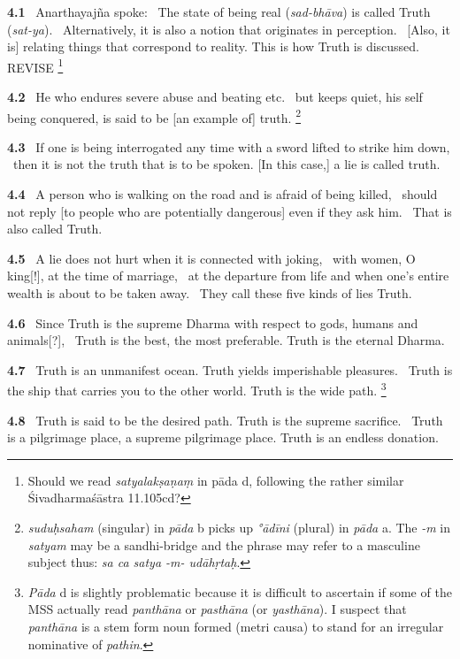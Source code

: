 \documentclass{article}
\newcommand{\skt}[1]{\textit{#1}}
\begin{document}
\textbf{4.1}%
\ Anarthayajña spoke:%
\ The state of being real (\skt{sad-bhāva}) is called Truth (\skt{sat-ya}).%
\          Alternatively, it is also a notion that originates in perception.%
\          [Also, it is] relating things that correspond to reality. This is how Truth is discussed. REVISE%
\footnote{Should we read \skt{satyalakṣaṇaṃ} in pāda d, following the rather similar                         Śivadharmaśāstra 11.105cd? }%


\textbf{4.2}%
\ He who endures severe abuse and beating etc.%
\ but keeps quiet, his self being conquered, is said to be [an example of] truth.%
\footnote{\skt{suduḥsaham} (singular) in \skt{pāda} b picks up \skt{°ādīni} (plural) in \skt{pāda} a.        The \skt{-m} in \skt{satyam} may be a sandhi-bridge and the phrase may refer to a        masculine subject thus: \skt{sa ca satya -m- udāhṛtaḥ}. }%


\textbf{4.3}%
\ If one is being interrogated any time with a sword lifted to strike him down,%
\         then it is not the truth that is to be spoken. [In this case,] a lie is called truth.%


\textbf{4.4}%
\ A person who is walking on the road and is afraid of being killed,%
\         should not reply [to people who are potentially dangerous] even if they ask him.%
\                         That is also called Truth.%


\textbf{4.5}%
\ A lie does not hurt when it is connected with joking,%
\         with women, O king[!], at the time of marriage,%
\         at the departure from life and when one's entire wealth is about to be taken away.%
\         They call these five kinds of lies Truth.%


\textbf{4.6}%
\ Since Truth is the supreme Dharma with respect to gods, humans and animals[?],%
\         Truth is the best, the most preferable. Truth is the eternal Dharma.%


\textbf{4.7}%
\ Truth is an unmanifest ocean. Truth yields imperishable pleasures.%
\         Truth is the ship that carries you to the other world. Truth is the wide path.%
\footnote{\skt{Pāda} d is slightly problematic because it is difficult to ascertain if some of the                MSS actually read \skt{panthāna} or \skt{pasthāna} (or \skt{yasthāna}).                I suspect that \skt{panthāna} is a stem form noun formed (metri causa) to stand for an irregular nominative                of \skt{pathin}. }%


\textbf{4.8}%
\ Truth is said to be the desired path. Truth is the supreme sacrifice.%
\         Truth is a pilgrimage place, a supreme pilgrimage place. Truth is an endless donation.%
\end{document}
